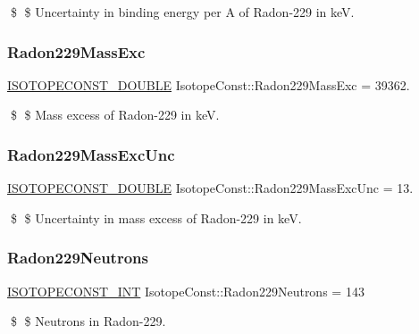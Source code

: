 \$ \$ Uncertainty in binding energy per A of Radon-\/229 in keV. \mbox{\label{group___isotope_const-_radon-_rn229_gabd89ee7fbd4e737fd8f373d4c4c9d2dc}} 
\subsubsection{\texorpdfstring{Radon229\+Mass\+Exc}{Radon229MassExc}}
{\footnotesize\ttfamily \mbox{\hyperlink{group___isotope_const-_macros_ga8f45a7272ce02c0b4c65c44636ed719a}{I\+S\+O\+T\+O\+P\+E\+C\+O\+N\+S\+T\+\_\+\+D\+O\+U\+B\+LE}} Isotope\+Const\+::\+Radon229\+Mass\+Exc = 39362.}

\$ \$ Mass excess of Radon-\/229 in keV. \mbox{\label{group___isotope_const-_radon-_rn229_ga8bac571463a7d9f30547ab19f735fe43}} 
\subsubsection{\texorpdfstring{Radon229\+Mass\+Exc\+Unc}{Radon229MassExcUnc}}
{\footnotesize\ttfamily \mbox{\hyperlink{group___isotope_const-_macros_ga8f45a7272ce02c0b4c65c44636ed719a}{I\+S\+O\+T\+O\+P\+E\+C\+O\+N\+S\+T\+\_\+\+D\+O\+U\+B\+LE}} Isotope\+Const\+::\+Radon229\+Mass\+Exc\+Unc = 13.}

\$ \$ Uncertainty in mass excess of Radon-\/229 in keV. \mbox{\label{group___isotope_const-_radon-_rn229_gae2b252b3c65445a373412087db1992b8}} 
\subsubsection{\texorpdfstring{Radon229\+Neutrons}{Radon229Neutrons}}
{\footnotesize\ttfamily \mbox{\hyperlink{group___isotope_const-_macros_ga5f18360b3e99483a35c32d789e62621c}{I\+S\+O\+T\+O\+P\+E\+C\+O\+N\+S\+T\+\_\+\+I\+NT}} Isotope\+Const\+::\+Radon229\+Neutrons = 143}

\$ \$ Neutrons in Radon-\/229. \mbox{\label{group___isotope_const-_radon-_rn229_gac0882dcd76a4a1332bc20c5a4e4a1731}} 
